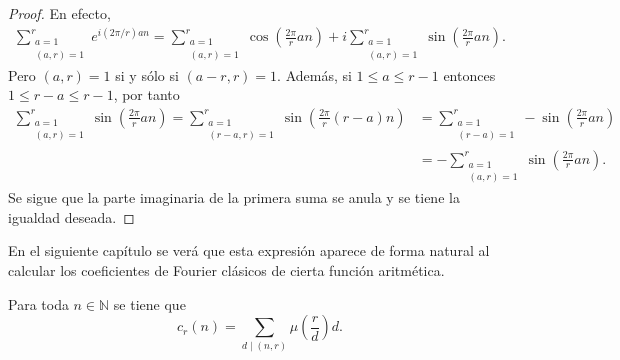 \begin{proof}
En efecto,
\begin{align*}
    \sum_{\substack{a=1 \\ (a,r)=1}}^{r} e^{i(2 \pi / r) a n} = \sum_{\substack{a=1 \\ (a,r)=1}}^{r} \cos \left( \frac{2 \pi}{r} a n \right) + i \sum_{\substack{a=1 \\ (a,r)=1}}^{r} \sin \left( \frac{2 \pi}{r} a n \right).
\end{align*}
Pero $(a,r)=1$ si y sólo si $(a-r,r)=1$. Además, si $1 \le a \le r-1$ entonces $1 \le r-a \le r-1$, por tanto
\begin{align*}
    \sum_{\substack{a=1 \\ (a,r)=1}}^{r} \sin \left( \frac{2 \pi}{r} a n \right) = \sum_{\substack{a=1 \\ (r-a,r)=1}}^{r} \sin \left( \frac{2 \pi}{r} (r-a) n \right) & = \sum_{\substack{a=1 \\ (r-a)=1}}^{r} - \sin \left( \frac{2 \pi}{r} a n \right) \\
                                                                                 &= - \sum_{\substack{a=1 \\ (a,r)=1}}^{r} \sin \left( \frac{2 \pi}{r} a n \right).
\end{align*}
Se sigue que la parte imaginaria de la primera suma se anula y se tiene la igualdad deseada.
\end{proof}

En el siguiente capítulo se verá que esta expresión aparece de forma natural al calcular los coeficientes de Fourier clásicos de cierta función aritmética.

\begin{proposition}
Para toda $n \in \mathbb{N}$ se tiene que
\begin{equation*}
    c_r(n) = \sum_{d \mid (n,r)} \mu \left( \frac{r}{d} \right) d.
\end{equation*}
\end{proposition}

